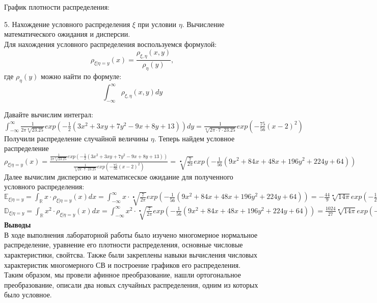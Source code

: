 \documentclass{article}
\begin{document}
График плотности распределения:\\

\newpage

5. Нахождение условного распределения $\xi$ при условии $\eta$. Вычисление математического ожидания и дисперсии.\\

Для нахождения условного распределения воспользуемся формулой:$$\rho_{\xi|\eta=y}(x)=\frac{\rho_{\xi,\eta}(x,y)}{\rho_{\eta}(y)},$$ где $\rho_{\eta}(y)$ можно найти по формуле:
$$\int_{-\infty}^\infty\rho_{\xi,\eta}(x,y)dy$$

Давайте вычислим интеграл:\\

$\int_{-\infty}^\infty \frac{1}{2\pi\sqrt[•]{23.25}}exp(-\frac{1}{2}(3x^2+3xy+7y^2-9x+8y+13))dy=\frac{1}{\sqrt[•]{2\pi\cdot7\cdot23.25}}exp(-\frac{75}{56}(x-2)^2)$\\
 
Получили распределение случайной величины $\eta$. Теперь найдем условное распределение\\

$\rho_{\xi|\eta=y}(x)= \frac{\frac{1}{2\pi\sqrt[•]{23.25}}exp(-\frac{1}{2}(3x^2+3xy+7y^2-9x+8y+13))}{\frac{1}{\sqrt[•]{2\pi\cdot7\cdot23.25}}exp(-\frac{75}{56}(x-2)^2)}=\sqrt[•]{\frac{7}{2\pi}}exp(-\frac{1}{56}(9x^2+84x+48x+196y^2+224y+64))$\\

Далее вычислим дисперсию и математисеское ожидание для полученного условного распределения:\\

$\mathbb{E}_{\xi|\eta=y}=\int_\mathbb{R}x\cdot\rho_{\xi|\eta=y}(x)dx=\int_{-\infty}^\infty x\cdot\sqrt[•]{\frac{7}{2\pi}}exp(-\frac{1}{56}(9x^2+84x+48x+196y^2+224y+64))=-\frac{44}{9}\sqrt[•]{14\pi} exp(-\frac{1}{2}(y-1)(7y+15))$\\

$\mathbb{D}_{\xi|\eta=y}=\int_\mathbb{R}x^2\cdot\rho_{\xi|\eta=y}(x)dx=\int_{-\infty}^\infty x^2\cdot\sqrt[•]{\frac{7}{2\pi}}exp(-\frac{1}{56}(9x^2+84x+48x+196y^2+224y+64))=\frac{1024}{27}\sqrt[•]{14\pi} exp(-\frac{1}{2}(y-1)(7y+15))$\\
\newpage
\textbf{Выводы}\\
В ходе выполнения лабораторной работы было изучено многомерное нормальное распределение, уравнение его плотности распределения, основные числовые характеристики, свойтсва. Также были закреплены навыки вычисления числовых характеристик многомерного СВ и построение графиков его распределения. Таким образом, мы провели афинное преобразование, нашли ортогональное преобразование, описали два новых случайных распределения, одним из которых было условное.
\end{document}
